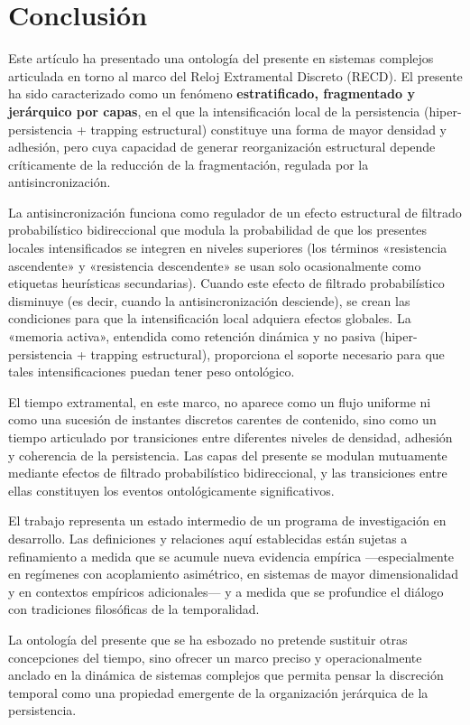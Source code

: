 \section{Conclusión}

Este artículo ha presentado una ontología del presente en sistemas complejos articulada en torno al marco del Reloj Extramental Discreto (RECD). El presente ha sido caracterizado como un fenómeno \textbf{estratificado, fragmentado y jerárquico por capas}, en el que la intensificación local de la persistencia (hiper-persistencia + trapping estructural) constituye una forma de mayor densidad y adhesión, pero cuya capacidad de generar reorganización estructural depende críticamente de la reducción de la fragmentación, regulada por la antisincronización.

La antisincronización funciona como regulador de un efecto estructural de filtrado probabilístico bidireccional que modula la probabilidad de que los presentes locales intensificados se integren en niveles superiores (los términos «resistencia ascendente» y «resistencia descendente» se usan solo ocasionalmente como etiquetas heurísticas secundarias). Cuando este efecto de filtrado probabilístico disminuye (es decir, cuando la antisincronización desciende), se crean las condiciones para que la intensificación local adquiera efectos globales. La «memoria activa», entendida como retención dinámica y no pasiva (hiper-persistencia + trapping estructural), proporciona el soporte necesario para que tales intensificaciones puedan tener peso ontológico.

El tiempo extramental, en este marco, no aparece como un flujo uniforme ni como una sucesión de instantes discretos carentes de contenido, sino como un tiempo articulado por transiciones entre diferentes niveles de densidad, adhesión y coherencia de la persistencia. Las capas del presente se modulan mutuamente mediante efectos de filtrado probabilístico bidireccional, y las transiciones entre ellas constituyen los eventos ontológicamente significativos.

El trabajo representa un estado intermedio de un programa de investigación en desarrollo. Las definiciones y relaciones aquí establecidas están sujetas a refinamiento a medida que se acumule nueva evidencia empírica —especialmente en regímenes con acoplamiento asimétrico, en sistemas de mayor dimensionalidad y en contextos empíricos adicionales— y a medida que se profundice el diálogo con tradiciones filosóficas de la temporalidad.

La ontología del presente que se ha esbozado no pretende sustituir otras concepciones del tiempo, sino ofrecer un marco preciso y operacionalmente anclado en la dinámica de sistemas complejos que permita pensar la discreción temporal como una propiedad emergente de la organización jerárquica de la persistencia.